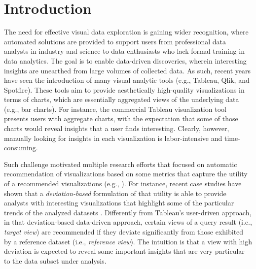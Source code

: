 
\section{Introduction}
\label{introduction}


The need for effective visual data exploration is gaining wider recognition, where automated solutions are  provided to support users from professional data analysts in industry and science to data enthusiasts who lack formal training in data analytics.
%
The goal is to enable data-driven discoveries, wherein interesting insights are unearthed from large volumes of collected data.
%
As such, recent years have seen the introduction of many visual analytic tools (e.g., Tableau, Qlik, and Spotfire). 
%
These tools aim to provide aesthetically high-quality visualizations in terms of charts, which are essentially aggregated views of the underlying data (e.g., bar charts).
%
For instance, the commercial Tableau visualization tool presents users with aggregate charts, with the expectation that some of those charts would reveal insights that a user finds interesting. 
%
Clearly, however, manually looking for insights in each visualization is labor-intensive and time-consuming. 

%
%
Such challenge motivated multiple research efforts that focused on automatic recommendation of visualizations based on some metrics that capture the utility of a recommended visualizations (e.g., \cite{Key2012,Viegas2007,DBLP:journals/pvldb/SellamK16,DBLP:conf/ssdbm/SellamK16, Vartak2014,Vartak2015,Ehsan2016,kandel2012profiler,DBLP:journals/tvcg/SeoS06}). 
%
For instance, recent case studies have shown that a {\em deviation-based} formulation of that utility is able to provide analysts with interesting visualizations that highlight some of the particular trends of the analyzed datasets \cite{Vartak2014, Vartak2015, TKDEHumaira, Ehsan2016}.
%
Differently from Tableau's user-driven approach, in that deviation-based data-driven approach, certain views of a query result (i.e., {\em target view}) are recommended if they deviate significantly from those exhibited by a reference dataset (i.e., {\em reference view}).
%
The intuition is that a view with high deviation is expected to reveal some important insights that are very particular to the data subset under analysis. 




